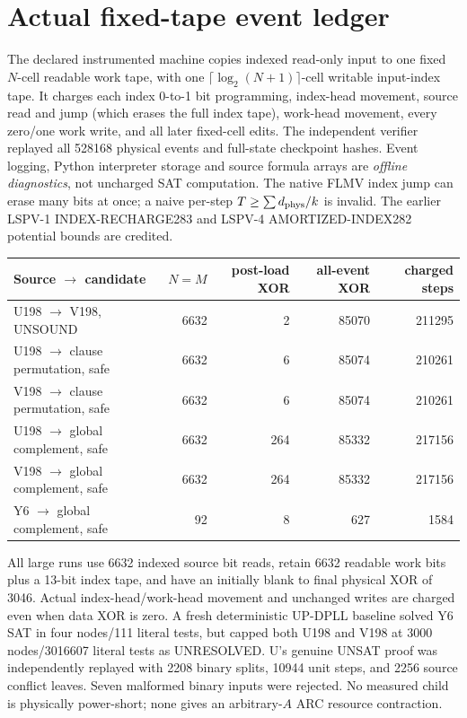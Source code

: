 \documentclass[11pt]{article}
\begin{document}
\section{Actual fixed-tape event ledger}
The declared instrumented machine copies indexed read-only input to one fixed $N$-cell readable work tape, with one $\lceil\log_2(N+1)\rceil$-cell writable input-index tape. It charges each index 0-to-1 bit programming, index-head movement, source read and jump (which erases the full index tape), work-head movement, every zero/one work write, and all later fixed-cell edits. The independent verifier replayed all 528168 physical events and full-state checkpoint hashes. Event logging, Python interpreter storage and source formula arrays are \emph{offline diagnostics}, not uncharged SAT computation. The native FLMV index jump can erase many bits at once; a naive per-step $T\ge\sum d_{\rm phys}/k$ is invalid. The earlier LSPV-1 INDEX-RECHARGE283 and LSPV-4 AMORTIZED-INDEX282 potential bounds are credited.
\begin{center}\begin{tabular}{lrrrr}\toprule
Source $\to$ candidate & $N=M$ & post-load XOR & all-event XOR & charged steps\\\midrule
U198 $\to$ V198, UNSOUND & 6632&2&85070&211295\\
U198 $\to$ clause permutation, safe&6632&6&85074&210261\\
V198 $\to$ clause permutation, safe&6632&6&85074&210261\\
U198 $\to$ global complement, safe&6632&264&85332&217156\\
V198 $\to$ global complement, safe&6632&264&85332&217156\\
Y6 $\to$ global complement, safe&92&8&627&1584\\\bottomrule
\end{tabular}\end{center}
All large runs use 6632 indexed source bit reads, retain 6632 readable work bits plus a 13-bit index tape, and have an initially blank to final physical XOR of 3046. Actual index-head/work-head movement and unchanged writes are charged even when data XOR is zero. A fresh deterministic UP-DPLL baseline solved Y6 SAT in four nodes/111 literal tests, but capped both U198 and V198 at 3000 nodes/3016607 literal tests as UNRESOLVED. U's genuine UNSAT proof was independently replayed with 2208 binary splits, 10944 unit steps, and 2256 source conflict leaves. Seven malformed binary inputs were rejected. No measured child is physically power-short; none gives an arbitrary-$A$ ARC resource contraction.
\end{document}
